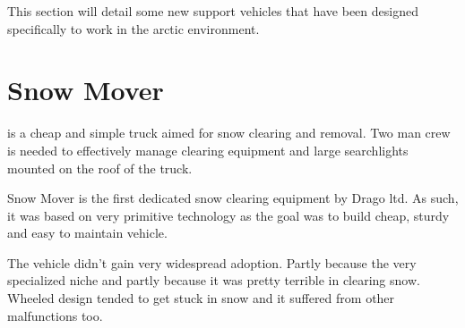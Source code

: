 \documentclass{tufte-book}
\begin{document}
This section will detail some new support vehicles that have been
designed specifically to work in the arctic environment.



\section{Snow Mover}
 is a cheap and simple truck aimed for snow clearing and
removal. Two man crew is needed to effectively manage clearing equipment
and large searchlights mounted on the roof of the truck.

Snow Mover is the first dedicated snow clearing equipment by Drago ltd. As
such, it was based on very primitive technology as the goal was to build
cheap, sturdy and easy to maintain vehicle.

The vehicle didn't gain very widespread adoption. Partly because the very
specialized niche and partly because it was pretty terrible in clearing
snow. Wheeled design tended to get stuck in snow and it suffered from
other malfunctions too.
\end{document}
